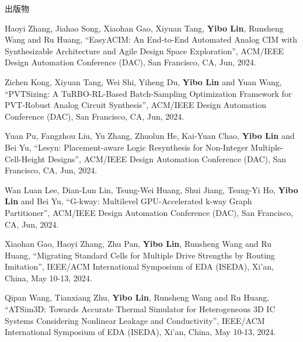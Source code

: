 \begin{rSection}{出版物}
\begin{description}[font=\normalfont, rightmargin=2em]
{}
            

\item[{[C100]}]{
        Haoyi Zhang, Jiahao Song, Xiaohan Gao, Xiyuan Tang, \textbf{Yibo Lin}, Runsheng Wang and Ru Huang, 
    ``EasyACIM: An End-to-End Automated Analog CIM with Synthesizable Architecture and Agile Design Space Exploration'', 
    ACM/IEEE Design Automation Conference (DAC), San Francisco, CA, Jun, 2024.
    
}
            

\item[{[C99]}]{
        Zichen Kong, Xiyuan Tang, Wei Shi, Yiheng Du, \textbf{Yibo Lin} and Yuan Wang, 
    ``PVTSizing: A TuRBO-RL-Based Batch-Sampling Optimization Framework for PVT-Robust Analog Circuit Synthesis'', 
    ACM/IEEE Design Automation Conference (DAC), San Francisco, CA, Jun, 2024.
    
}
            

\item[{[C98]}]{
        Yuan Pu, Fangzhou Liu, Yu Zhang, Zhuolun He, Kai-Yuan Chao, \textbf{Yibo Lin} and Bei Yu, 
    ``Lesyn: Placement-aware Logic Resynthesis for Non-Integer Multiple-Cell-Height Designs'', 
    ACM/IEEE Design Automation Conference (DAC), San Francisco, CA, Jun, 2024.
    
}
            

\item[{[C97]}]{
        Wan Luan Lee, Dian-Lun Lin, Tsung-Wei Huang, Shui Jiang, Tsung-Yi Ho, \textbf{Yibo Lin} and Bei Yu, 
    ``G-kway: Multilevel GPU-Accelerated k-way Graph Partitioner'', 
    ACM/IEEE Design Automation Conference (DAC), San Francisco, CA, Jun, 2024.
    
}
            

\item[{[C96]}]{
        Xiaohan Gao, Haoyi Zhang, Zhu Pan, \textbf{Yibo Lin}, Runsheng Wang and Ru Huang, 
    ``Migrating Standard Cells for Multiple Drive Strengths by Routing Imitation'', 
    IEEE/ACM International Symposium of EDA (ISEDA), Xi'an, China, May 10-13, 2024.
    
}
            

\item[{[C95]}]{
        Qipan Wang, Tianxiang Zhu, \textbf{Yibo Lin}, Runsheng Wang and Ru Huang, 
    ``ATSim3D: Towards Accurate Thermal Simulator for Heterogeneous 3D IC Systems Considering Nonlinear Leakage and Conductivity'', 
    IEEE/ACM International Symposium of EDA (ISEDA), Xi'an, China, May 10-13, 2024.
    
}
\end{description}
\end{rSection}
